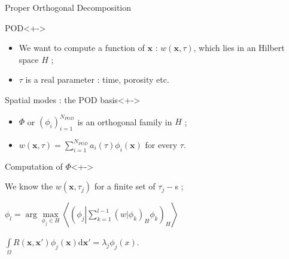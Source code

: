 
\begin{frame}{Proper Orthogonal Decomposition}
%
\begin{block}{POD}<+->
%
\begin{itemize}
\item<+-> We want to compute a function of $\mathbf{x}$ : $w(\mathbf{x},\tau)$, which lies in an Hilbert space $H$ ;
\item<+-> $\tau$ is a real parameter : time, porosity etc.
\end{itemize}
%
\end{block}
%
\begin{block}{Spatial modes : the POD basis}<+->
\begin{itemize}
\item<+-> $\Phi$ or $(\phi_i)_{i=1}^{N_{POD}}$ is an orthogonal family in $H$ ;
\item<+-> $w(\mathbf{x},\tau)=\sum\limits_{i=1}^{N_{POD}} a_i(\tau)\phi_i(\mathbf{x})$ for every $\tau$.
\end{itemize}
\end{block}
%
\begin{block}{Computation of $\Phi$}<+->
\begin{description}
\item<+-> [Data :] We know the $w(\mathbf{x},\tau_j)$ for a finite set of $\tau_j-$s ;
\item<+-> [Optimality of $\Phi$] $\phi_l= \arg\max\limits_{\phi_j\in H}\left\langle\left(\phi_j\left|\sum\limits_{k=1}^{l-1}\left(w|\phi_k\right)_H\phi_k\right.\right)_H\right\rangle$%
\item<+-> [Fredholm equation] $\int\limits_{\Omega}R(\mathbf{x},\mathbf{x'})\phi_j (\mathbf{x})\text{d}\mathbf{x'}=\lambda_j \phi_j (x)$.
\end{description}
\end{block}
%
\end{frame}

